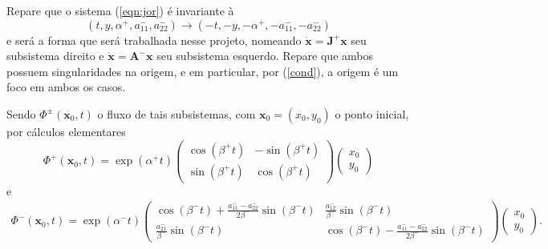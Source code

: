 Repare que o sistema (\ref{eqn:jor}) é invariante à
\begin{equation}
\label{eqn:inva}
(t, y, \alpha^{+}, a_{11}^{-}, a_{22}^{-}) \rightarrow(-t,-y,-\alpha^{+},-a_{11}^{-},-a_{22}^{-})
\end{equation}
e será a forma que será trabalhada nesse projeto, nomeando $\dot{\mathbf{x}}=\mathbf{J}^{+} \mathbf{x}$ seu subsistema direito e $\dot{\mathbf{x}}=\mathbf{A}^{-} \mathbf{x}$ seu subsistema esquerdo. Repare que ambos possuem singularidades na origem, e em particular, por  (\ref{cond}), a origem é um foco em ambos os casos. 

Sendo $\Phi^{\pm}(\mathbf{x}_{0}, t)$ o fluxo de tais subsistemas, com $\mathbf{x}_{0}=(x_{0}, y_{0})$ o ponto inicial, por cálculos elementares
\[
\Phi^{+}(\mathbf{x}_{0}, t)=\exp (\alpha^{+} t) \left(\begin{array}{cc}
\cos (\beta^{+} t) & -\sin (\beta^{+} t) \\
\sin (\beta^{+} t) & \cos (\beta^{+} t)
\end{array}\right) \left(\begin{array}{l}
x_{0} \\
y_{0}
\end{array}\right)
\]
e
\[
\begin{aligned}
\Phi^{-}(\mathbf{x}_{0}, t)=\exp (\alpha^{-} t)\left(\begin{array}{cc}
\cos (\beta^{-} t)+\frac{a_{11}^{-}-a_{22}^{-}}{2 \beta^{-}} \sin (\beta^{-} t) & \frac{a_{12}^{-}}{\beta^{-}} \sin (\beta^{-} t) \\
\frac{a_{21}^{-}}{\beta^{-}} \sin (\beta^{-} t) & \cos (\beta^{-} t)-\frac{a_{11}^{-}-a_{22}^{-}}{2 \beta^{-}} \sin (\beta^{-} t)
\end{array}\right) \left(\begin{array}{l}
x_{0} \\
y_{0}
\end{array}\right).
\end{aligned}
\]
